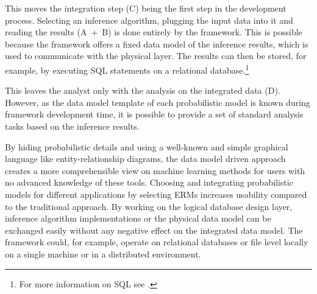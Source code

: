 This moves the integration step (C) being the first step in the development process. Selecting an inference algorithm, plugging the input data into it and reading the results (A~+~B) is done entirely by the framework. This is possible because the framework offers a fixed data model of the inference results, which is used to communicate with the physical layer. The results can then be stored, for example, by executing SQL statements on a relational database.\footnote{For more information on SQL see \textcite{date1987guide}.}

This leaves the analyst only with the analysis on the integrated data (D). However, as the data model template of each probabilistic model is known during framework development time, it is possible to provide a set of standard analysis tasks based on the inference results.

By hiding probabilistic details and using a well-known and simple graphical language like entity-relationship diagrams, the data model driven approach creates a more comprehensible view on machine learning methods for users with no advanced knowledge of these tools. Choosing and integrating probabilistic models for different applications by selecting ERMs increases usability compared to the traditional approach. By working on the logical database design layer, inference algorithm implementations or the physical data model can be exchanged easily without any negative effect on the integrated data model. The framework could, for example, operate on relational databases or file level locally on a single machine or in a distributed environment.

